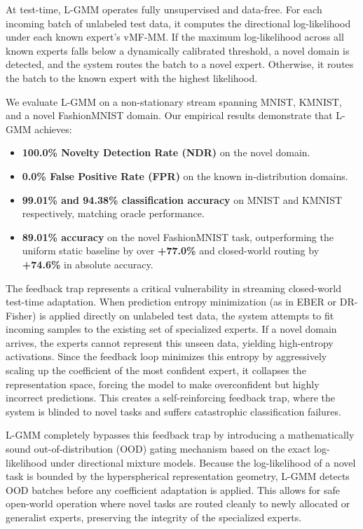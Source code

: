 \documentclass{article}
\theoremstyle{plain}
\theoremstyle{definition}
\theoremstyle{remark}
\begin{document}
At test-time, L-GMM operates fully unsupervised and data-free. For each incoming batch of unlabeled test data, it computes the directional log-likelihood under each known expert's vMF-MM. If the maximum log-likelihood across all known experts falls below a dynamically calibrated threshold, a novel domain is detected, and the system routes the batch to a novel expert. Otherwise, it routes the batch to the known expert with the highest likelihood. 

We evaluate L-GMM on a non-stationary stream spanning MNIST, KMNIST, and a novel FashionMNIST domain. Our empirical results demonstrate that L-GMM achieves:
\begin{itemize}
    \item \textbf{100.0\% Novelty Detection Rate (NDR)} on the novel domain.
    \item \textbf{0.0\% False Positive Rate (FPR)} on the known in-distribution domains.
    \item \textbf{99.01\% and 94.38\% classification accuracy} on MNIST and KMNIST respectively, matching oracle performance.
    \item \textbf{89.01\% accuracy} on the novel FashionMNIST task, outperforming the uniform static baseline by over \textbf{+77.0\%} and closed-world routing by \textbf{+74.6\%} in absolute accuracy.
\end{itemize}

The feedback trap represents a critical vulnerability in streaming closed-world test-time adaptation. When prediction entropy minimization (as in EBER or DR-Fisher) is applied directly on unlabeled test data, the system attempts to fit incoming samples to the existing set of specialized experts. If a novel domain arrives, the experts cannot represent this unseen data, yielding high-entropy activations. Since the feedback loop minimizes this entropy by aggressively scaling up the coefficient of the most confident expert, it collapses the representation space, forcing the model to make overconfident but highly incorrect predictions. This creates a self-reinforcing feedback trap, where the system is blinded to novel tasks and suffers catastrophic classification failures.

L-GMM completely bypasses this feedback trap by introducing a mathematically sound out-of-distribution (OOD) gating mechanism based on the exact log-likelihood under directional mixture models. Because the log-likelihood of a novel task is bounded by the hyperspherical representation geometry, L-GMM detects OOD batches before any coefficient adaptation is applied. This allows for safe open-world operation where novel tasks are routed cleanly to newly allocated or generalist experts, preserving the integrity of the specialized experts.
\end{document}
